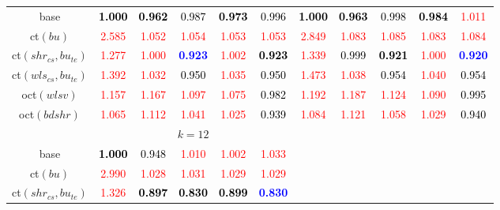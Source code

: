 \begin{tabular}[t]{c|>{}cccc>{}c|ccccc}
base & \textcolor{black}{\textbf{1.000}} & \textcolor{black}{\textbf{0.962}} & \textcolor{black}{0.987} & \textcolor{black}{\textbf{0.973}} & \textcolor{black}{0.996} & \textcolor{black}{\textbf{1.000}} & \textcolor{black}{\textbf{0.963}} & \textcolor{black}{0.998} & \textcolor{black}{\textbf{0.984}} & \textcolor{red}{1.011}\\
ct$(bu)$ & \textcolor{red}{2.585} & \textcolor{red}{1.052} & \textcolor{red}{1.054} & \textcolor{red}{1.053} & \textcolor{red}{1.053} & \textcolor{red}{2.849} & \textcolor{red}{1.083} & \textcolor{red}{1.085} & \textcolor{red}{1.083} & \textcolor{red}{1.084}\\
ct$(shr_{cs}, bu_{te})$ & \textcolor{red}{1.277} & \textcolor{red}{1.000} & \textcolor{blue}{\textbf{0.923}} & \textcolor{red}{1.002} & \textcolor{black}{\textbf{0.923}} & \textcolor{red}{1.339} & \textcolor{black}{0.999} & \textcolor{black}{\textbf{0.921}} & \textcolor{red}{1.000} & \textcolor{blue}{\textbf{0.920}}\\
ct$(wls_{cs}, bu_{te})$ & \textcolor{red}{1.392} & \textcolor{red}{1.032} & \textcolor{black}{0.950} & \textcolor{red}{1.035} & \textcolor{black}{0.950} & \textcolor{red}{1.473} & \textcolor{red}{1.038} & \textcolor{black}{0.954} & \textcolor{red}{1.040} & \textcolor{black}{0.954}\\
oct$(wlsv)$ & \textcolor{red}{1.157} & \textcolor{red}{1.167} & \textcolor{red}{1.097} & \textcolor{red}{1.075} & \textcolor{black}{0.982} & \textcolor{red}{1.192} & \textcolor{red}{1.187} & \textcolor{red}{1.124} & \textcolor{red}{1.090} & \textcolor{black}{0.995}\\
oct$(bdshr)$ & \textcolor{red}{1.065} & \textcolor{red}{1.112} & \textcolor{red}{1.041} & \textcolor{red}{1.025} & \textcolor{black}{0.939} & \textcolor{red}{1.084} & \textcolor{red}{1.121} & \textcolor{red}{1.058} & \textcolor{red}{1.029} & \textcolor{black}{0.940}\\
\addlinespace[0.3em]
\multicolumn{1}{c}{} & \multicolumn{5}{c}{\textbf{$k = 12$}} & \multicolumn{5}{c}{}\\
base & \textcolor{black}{\textbf{1.000}} & \textcolor{black}{0.948} & \textcolor{red}{1.010} & \textcolor{red}{1.002} & \textcolor{red}{1.033} &  &  &  &  & \\
ct$(bu)$ & \textcolor{red}{2.990} & \textcolor{red}{1.028} & \textcolor{red}{1.031} & \textcolor{red}{1.029} & \textcolor{red}{1.029} &  &  &  &  & \\
ct$(shr_{cs}, bu_{te})$ & \textcolor{red}{1.326} & \textcolor{black}{\textbf{0.897}} & \textcolor{black}{\textbf{0.830}} & \textcolor{black}{\textbf{0.899}} & \textcolor{blue}{\textbf{0.830}} &  &  &  &  & \\

\end{tabular}
